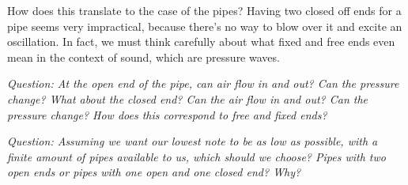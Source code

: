 \documentclass[a4paper, 11pt]{article}
\begin{document}
How does this translate to the case of the pipes? Having two closed off ends for a pipe seems very impractical, because there's no way to blow over it and excite an oscillation. In fact, we must think carefully about what fixed and free ends even mean in the context of sound, which are pressure waves.

\textit{Question: At the open end of the pipe, can air flow in and out? Can the pressure change? What about the closed end? Can the air flow in and out? Can the pressure change? How does this correspond to free and fixed ends?}
\vspace{6cm}

\newpage 
\textit{Question: Assuming we want our lowest note to be as low as possible, with a finite amount of pipes available to us, which should we choose? Pipes with two open ends or pipes with one open and one closed end? Why?}
\vspace{4cm}

\end{document}
